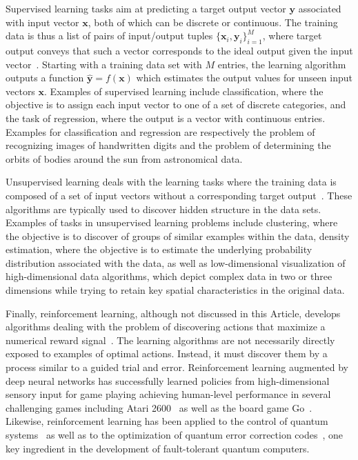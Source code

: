 \documentclass[twocolumn,english,reprint,superscriptaddress,longbibliography,pra]{revtex4-1}
\begin{document}
Supervised learning tasks aim at predicting a target output vector $\bm y$ associated with input vector $\bm x$,  both of which can be discrete or continuous. The training data is thus a list of pairs of input/output tuples $\{ \bm x_i,\bm y_i\}_{i=1}^{M}$, where target output conveys that such a vector corresponds to the ideal output given the input vector~\cite{10.5555/1162264}. Starting with a training data set with $M$ entries, the learning algorithm outputs a function $\hat{\bm y} = f(\bm x)$  which estimates the output values for unseen input vectors $\bm x$. Examples of supervised learning include classification, where the objective is to assign each input vector to one of a set of discrete categories, and the task of
regression, where the output is a vector with continuous entries. Examples for classification and regression are respectively the problem of recognizing images of handwritten digits and the problem of determining the orbits of bodies around the sun from astronomical data. 

Unsupervised learning deals with the learning tasks where the training data is composed of a set of input vectors without a corresponding target output~\cite{10.5555/1162264}. These algorithms are typically used to discover hidden structure in the data sets.  Examples of tasks in unsupervised learning problems include clustering, where the objective is to discover of groups of similar examples within the data, density estimation, where the objective is to estimate the underlying probability distribution associated with the data, as well as low-dimensional visualization of high-dimensional data algorithms, which depict complex data in two or three dimensions while trying to retain key spatial characteristics in the original data. 

Finally, reinforcement learning, although not discussed in this Article, develops algorithms  dealing with the problem of discovering actions that maximize a numerical reward signal~\cite{10.5555/551283}. The learning algorithms are not necessarily directly exposed to examples of optimal actions. Instead, it must discover them by a process similar to a guided trial and error. Reinforcement learning augmented by deep neural networks has successfully learned policies from high-dimensional sensory input for game playing achieving human-level performance in several challenging games including Atari 2600~\cite{mnih_human-level_2015} as well as the board game Go~\cite{silver2016}. Likewise, reinforcement learning has been applied to the control of quantum systems~\cite{bukov2018,niu_universal_2019} as well as to the optimization of quantum error correction codes~\cite{Nautrup2019optimizingquantum,Andreasson2019quantumerror,Evert2020QEC}, one key ingredient in the development of fault-tolerant quantum computers. 
\end{document}
